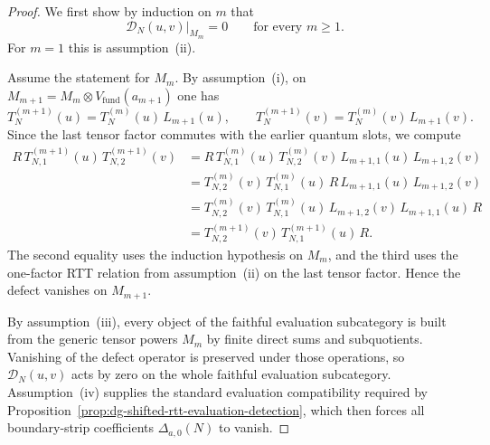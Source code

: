 \begin{proof}
We first show by induction on $m$ that
\[
\mathcal{D}_N(u,v)\big|_{M_m}=0
\qquad\text{for every } m\ge 1.
\]
For $m=1$ this is assumption~\textup{(ii)}.

Assume the statement for $M_m$. By assumption~\textup{(i)}, on
$M_{m+1}=M_m\otimes V_{\mathrm{fund}}(a_{m+1})$ one has
\[
T_N^{(m+1)}(u)=T_N^{(m)}(u)\,L_{m+1}(u),
\qquad
T_N^{(m+1)}(v)=T_N^{(m)}(v)\,L_{m+1}(v).
\]
Since the last tensor factor commutes with the earlier quantum slots,
we compute
\begin{align*}
R\,T^{(m+1)}_{N,1}(u)\,T^{(m+1)}_{N,2}(v)
&=
R\,T^{(m)}_{N,1}(u)\,T^{(m)}_{N,2}(v)\,
L_{m+1,1}(u)\,L_{m+1,2}(v) \\
&=
T^{(m)}_{N,2}(v)\,T^{(m)}_{N,1}(u)\,
R\,L_{m+1,1}(u)\,L_{m+1,2}(v) \\
&=
T^{(m)}_{N,2}(v)\,T^{(m)}_{N,1}(u)\,
L_{m+1,2}(v)\,L_{m+1,1}(u)\,R \\
&=
T^{(m+1)}_{N,2}(v)\,T^{(m+1)}_{N,1}(u)\,R.
\end{align*}
The second equality uses the induction hypothesis on $M_m$, and the
third uses the one-factor RTT relation from assumption~\textup{(ii)} on
the last tensor factor. Hence the defect vanishes on $M_{m+1}$.

By assumption~\textup{(iii)}, every object of the faithful evaluation
subcategory is built from the generic tensor powers $M_m$ by finite
direct sums and subquotients. Vanishing of the defect operator is
preserved under those operations, so $\mathcal{D}_N(u,v)$ acts by zero
on the whole faithful evaluation subcategory. Assumption~\textup{(iv)}
supplies the standard evaluation compatibility required by
Proposition~\ref{prop:dg-shifted-rtt-evaluation-detection}, which then
forces all boundary-strip coefficients $\Delta_{a,0}(N)$ to vanish.
\end{proof}

